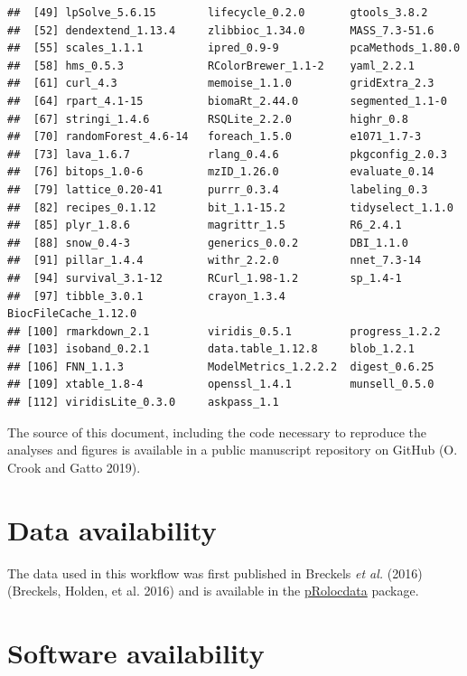 \documentclass[
]{article}
\begin{document}
\begin{verbatim}
##  [49] lpSolve_5.6.15        lifecycle_0.2.0       gtools_3.8.2         
##  [52] dendextend_1.13.4     zlibbioc_1.34.0       MASS_7.3-51.6        
##  [55] scales_1.1.1          ipred_0.9-9           pcaMethods_1.80.0    
##  [58] hms_0.5.3             RColorBrewer_1.1-2    yaml_2.2.1           
##  [61] curl_4.3              memoise_1.1.0         gridExtra_2.3        
##  [64] rpart_4.1-15          biomaRt_2.44.0        segmented_1.1-0      
##  [67] stringi_1.4.6         RSQLite_2.2.0         highr_0.8            
##  [70] randomForest_4.6-14   foreach_1.5.0         e1071_1.7-3          
##  [73] lava_1.6.7            rlang_0.4.6           pkgconfig_2.0.3      
##  [76] bitops_1.0-6          mzID_1.26.0           evaluate_0.14        
##  [79] lattice_0.20-41       purrr_0.3.4           labeling_0.3         
##  [82] recipes_0.1.12        bit_1.1-15.2          tidyselect_1.1.0     
##  [85] plyr_1.8.6            magrittr_1.5          R6_2.4.1             
##  [88] snow_0.4-3            generics_0.0.2        DBI_1.1.0            
##  [91] pillar_1.4.4          withr_2.2.0           nnet_7.3-14          
##  [94] survival_3.1-12       RCurl_1.98-1.2        sp_1.4-1             
##  [97] tibble_3.0.1          crayon_1.3.4          BiocFileCache_1.12.0 
## [100] rmarkdown_2.1         viridis_0.5.1         progress_1.2.2       
## [103] isoband_0.2.1         data.table_1.12.8     blob_1.2.1           
## [106] FNN_1.1.3             ModelMetrics_1.2.2.2  digest_0.6.25        
## [109] xtable_1.8-4          openssl_1.4.1         munsell_0.5.0        
## [112] viridisLite_0.3.0     askpass_1.1
\end{verbatim}

The source of this document, including the code necessary to reproduce
the analyses and figures is available in a public manuscript repository
on GitHub (O. Crook and Gatto 2019).

\hypertarget{data-availability}{%
\section{Data availability}\label{data-availability}}

The data used in this workflow was first published in Breckels \emph{et
al.} (2016) (Breckels, Holden, et al. 2016) and is available in the
\href{https://bioconductor.org/packages/release/data/experiment/html/pRolocdata.html}{pRolocdata}
package.

\hypertarget{software-availability}{%
\section{Software availability}\label{software-availability}}
\end{document}
